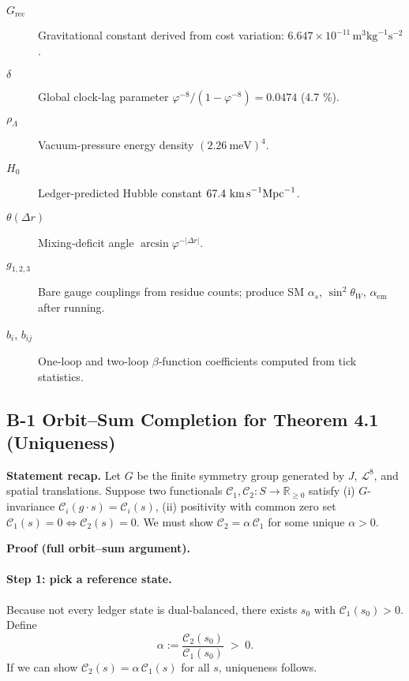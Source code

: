 \documentclass[11pt]{article}
\begin{document}
\begin{description}
\item[$G_{\text{rec}}$] Gravitational constant derived from cost variation: $6.647\times10^{-11}\,\text{m}^3\text{kg}^{-1}\text{s}^{-2}$.

\item[$\delta$] Global clock-lag parameter $\varphi^{-8}/(1-\varphi^{-8})=0.0474$ (4.7 \%).

\item[$\rho_\Lambda$] Vacuum-pressure energy density $(2.26\ \text{meV})^{4}$.

\item[$H_0$] Ledger-predicted Hubble constant $67.4\ \text{km\,s}^{-1}\text{Mpc}^{-1}$.

\item[$\theta(\Delta r)$] Mixing‐deficit angle $\arcsin\varphi^{-|{\Delta r}|}$.

\item[$g_{1,2,3}$] Bare gauge couplings from residue counts; produce SM $\alpha_s$, $\sin^2\theta_W$, $\alpha_{\text{em}}$ after running.

\item[$b_i$, $b_{ij}$] One-loop and two-loop $\beta$‐function coefficients computed from tick statistics.

\end{description}

\subsection*{B-1 Orbit–Sum Completion for Theorem 4.1 (Uniqueness)}
\label{app:orbit-sum}

\textbf{Statement recap.}  
Let \(G\) be the finite symmetry group generated by \(J\), \(\mathcal{L}^{8}\), and spatial translations.  
Suppose two functionals
\(\mathcal{C}_{1},\mathcal{C}_{2}:S\to\mathbb{R}_{\ge0}\) satisfy  
(i) \(G\)-invariance  
\(\mathcal{C}_{i}(g\!\cdot\!s)=\mathcal{C}_{i}(s)\),  
(ii) positivity with common zero set  
\(\mathcal{C}_{1}(s)=0\iff\mathcal{C}_{2}(s)=0\).  
We must show \(\mathcal{C}_{2}=\alpha\,\mathcal{C}_{1}\) for some unique \(\alpha>0\).

\bigskip
\textbf{Proof (full orbit–sum argument).}

\paragraph{Step 1: pick a reference state.}
Because not every ledger state is dual-balanced, there exists \(s_{0}\) with \(\mathcal{C}_{1}(s_{0})>0\).  
Define
\[
\alpha := \frac{\mathcal{C}_{2}(s_{0})}{\mathcal{C}_{1}(s_{0})}\;>\;0.
\]
If we can show \(\mathcal{C}_{2}(s)=\alpha\,\mathcal{C}_{1}(s)\) for all \(s\), uniqueness follows.
\end{document}
